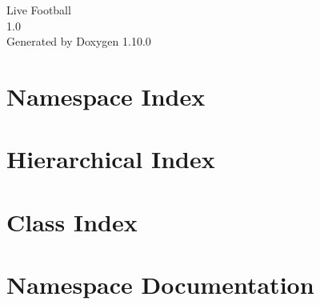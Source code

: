 \documentclass[twoside]{book}
\newcommand{\+}{\discretionary{\mbox{\scriptsize$\hookleftarrow$}}{}{}}
\newcommand{\clearemptydoublepage}{%
    \newpage{\pagestyle{empty}\cleardoublepage}%
  }
\begin{document}
  \raggedbottom
    \hypersetup{pageanchor=false,
                bookmarksnumbered=true,
                pdfencoding=unicode
               }
  \begin{titlepage}
  \vspace*{7cm}
  \begin{center}%
  {\Large Live Football}\\
  [1ex]\large 1.\+0 \\
  \vspace*{1cm}
  {\large Generated by Doxygen 1.10.0}\\
  \end{center}
  \end{titlepage}
  \clearemptydoublepage
  \tableofcontents
  \clearemptydoublepage
  \hypersetup{pageanchor=true}
\chapter{Namespace Index}

\chapter{Hierarchical Index}

\chapter{Class Index}

\chapter{Namespace Documentation}














\end{document}
